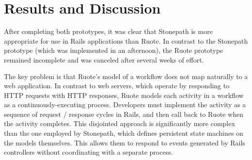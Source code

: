 \documentclass[document.tex]{subfiles}
\begin{document}
\FloatBarrier

\section {Results and Discussion}

After completing both prototypes, it was clear that Stonepath is more appropriate for use in Rails applications than Ruote. In contrast to the Stonepath prototype (which was implemented in an afternoon), the Ruote prototype remained incomplete and was canceled after several weeks of effort.

The key problem is that Ruote's model of a workflow does not map naturally to a web application. In contrast to web servers, which operate by responding to HTTP requests with HTTP responses, Ruote models each activity in a workflow as a continuously-executing process. Developers must implement the activity as a sequence of request / response cycles in Rails, and then call back to Ruote when the activity completes. This disjointed approach is significantly more complex than the one employed by Stonepath, which defines persistent state machines on the models themselves. This allows them to respond to events generated by Rails controllers without coordinating with a separate process.
\end{document}
